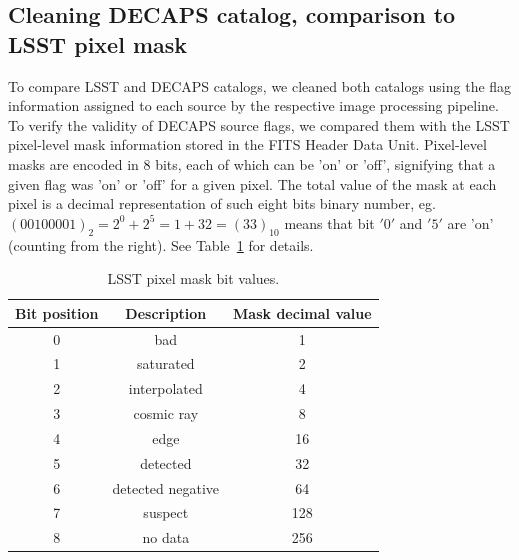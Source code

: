 \documentclass[DM,lsstdraft,toc,usenatbib]{lsstdoc}
\begin{document}


\subsection{Cleaning DECAPS catalog, comparison to LSST pixel mask}
\label{sec:clean_decaps}
To compare LSST and DECAPS catalogs, we cleaned both catalogs using the flag information assigned to each source by the respective image processing pipeline. To verify the validity of DECAPS source flags, we compared them with the LSST pixel-level mask information stored in the FITS Header Data Unit. Pixel-level masks are encoded in 8 bits,  each of which can be 'on' or 'off', signifying that a given flag was 'on' or 'off' for a given pixel. The total value of the mask at each pixel is a decimal representation of such eight bits binary number, eg.  $(00100001)_{2} = 2^{0} + 2^{5}  = 1 + 32 = (33)_{10} $ means that bit $'0'$ and $'5'$ are 'on' (counting from the right). See Table~\ref{tab:lsst_flags} for details. 


\begin{table}
\centering
\caption{LSST pixel mask bit values.}
\label{tab:lsst_flags}
\begin{tabular}{ ccc} 
\hline
Bit position & Description & Mask decimal value  \\ 
\hline
0  & bad               & 1    \\ 
1  & saturated         & 2   \\ 
2  & interpolated      & 4    \\ 
3  & cosmic ray        & 8    \\ 
4  & edge              & 16    \\ 
5  & detected          & 32   \\ 
6  & detected negative & 64   \\ 
7  & suspect           & 128   \\ 
8  & no data           & 256     \\ 
\hline
\end{tabular}
\end{table}
\end{document}
